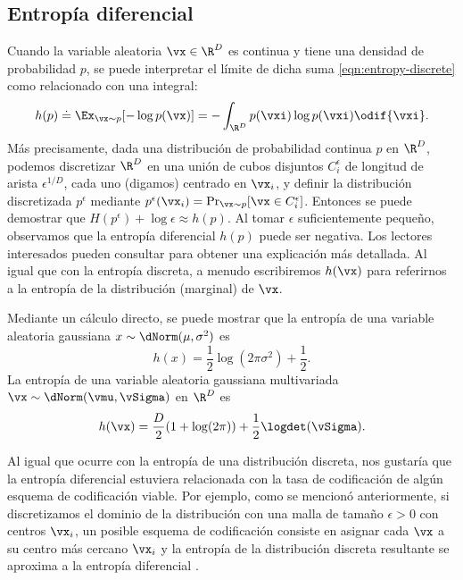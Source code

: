 \documentclass[../../book-main.tex]{subfiles}
\begin{document}
\subsection{Entropía diferencial}

Cuando la variable aleatoria \(\vx \in \R^{D}\) es continua y tiene una
densidad de probabilidad \(p\), se puede interpretar el límite de dicha suma
\eqref{eqn:entropy-discrete} como relacionado con una integral:
\begin{equation}
    h(p) \doteq \Ex_{\vx \sim p}[-\log p(\vx)] = - \int_{\R^{D}}
    p(\vxi) \log p(\vxi) \odif{\vxi}.
    \label{eqn:entropy-differential}
\end{equation}
Más precisamente, dada una distribución de probabilidad continua \(p\) en
\(\R^{D}\), podemos discretizar \(\R^{D}\) en una unión de cubos disjuntos
\(C_{i}^{\epsilon}\) de longitud de arista \(\epsilon^{1/D}\), cada uno (digamos)
centrado en \(\vx_{i}\), y definir la distribución discretizada
\(p^{\epsilon}\) mediante \(p^{\epsilon}(\vx_{i}) = \Pr_{\vx \sim p}[\vx
\in C_{i}^{\epsilon}]\). Entonces se puede demostrar que \(H(p^{\epsilon}) +
\log \epsilon \approx h(p)\). Al tomar \(\epsilon\) suficientemente pequeño,
observamos que la entropía diferencial \(h(p)\) puede ser negativa.
Los lectores interesados pueden consultar \cite{Cover-Thomas} para obtener una explicación más
detallada. Al igual que con la entropía discreta, a menudo
escribiremos \(h(\vx)\) para referirnos a la entropía de la distribución (marginal) de \(\vx\).

\begin{example}
    Mediante un cálculo directo, se puede mostrar que la entropía de una
    variable aleatoria gaussiana \(x \sim \dNorm(\mu, \sigma^{2})\) es
    \begin{equation}
        h(x) = \frac{1}{2}\log(2\pi\sigma^{2}) + \frac{1}{2}.
        \label{eqn:entropy-Gaussian}
    \end{equation}
    La entropía de una variable aleatoria gaussiana multivariada \(\vx \sim
    \dNorm(\vmu, \vSigma)\) en \(\R^{D}\) es
    \begin{equation}
        h(\vx) = \frac{D}{2}(1 + \log(2\pi)) +
        \frac{1}{2}\logdet(\vSigma).
        \label{eqn:entropy-Gaussian-multi}
    \end{equation}
\end{example}

Al igual que ocurre con la entropía de una distribución discreta, nos gustaría que la
entropía diferencial estuviera relacionada con la tasa de codificación de algún
esquema de codificación viable. Por ejemplo, como se mencionó anteriormente, si
discretizamos el dominio de la distribución con una malla de tamaño
\(\epsilon > 0\) con centros \(\vx_{i}\), un posible esquema de codificación
consiste en asignar cada \(\vx\) a su centro más cercano \(\vx_{i}\) y
la entropía de la distribución discreta resultante se aproxima a la
entropía diferencial \cite{Cover-Thomas}.
\end{document}
